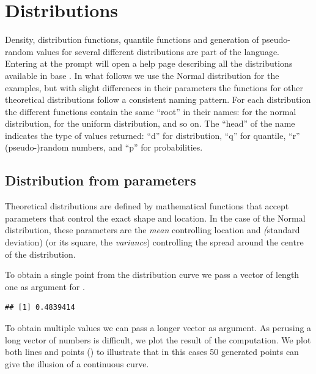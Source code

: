 \documentclass[krantz2]{krantz}\usepackage{knitr}%
\begin{document}
\section{Distributions}

Density, distribution functions, quantile functions and generation of pseudo-random values for several different distributions are part of the \Rlang language. Entering  at the \Rlang prompt will open a help page describing all the distributions available in base \Rlang. In what follows we use the Normal distribution for the examples, but with slight differences in their parameters the functions for other theoretical distributions follow a consistent naming pattern. For each distribution the different functions contain the same ``root'' in their names:  for the normal distribution,  for the uniform distribution, and so on. The ``head'' of the name indicates the type of values returned: ``d'' for distribution, ``q'' for quantile, ``r'' (pseudo-)random numbers, and ``p'' for probabilities.

\subsection{Distribution from parameters}

Theoretical distributions are defined by mathematical functions that accept parameters that control the exact shape and location. In the case of the Normal distribution, these parameters are the \emph{mean} controlling location and \emph(standard deviation) (or its square, the \emph{variance}) controlling the spread around the centre of the distribution.

To obtain a single point from the distribution curve we pass a vector of length one as argument for .
\begin{knitrout}\footnotesize
{}\color{fgcolor}\begin{kframe}
\begin{alltt}
\hlstd{(} \hlstd{=} \hlstd{,}  \hlstd{=} \hlstd{,}  \hlstd{=} \hlstd{)}
\end{alltt}
\begin{verbatim}
## [1] 0.4839414
\end{verbatim}
\end{kframe}
\end{knitrout}

To obtain multiple values we can pass a longer vector as argument. As perusing a long vector of numbers is difficult, we plot the result of the computation. We plot both lines and points () to illustrate that in this cases 50 generated points can give the illusion of a continuous curve.
\end{document}
